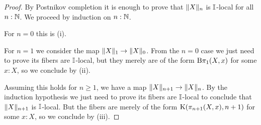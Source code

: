 \begin{proof}
By Postnikov completion it is enough to prove that $\lVert X \rVert_n$ is $\mathbb{I}$-local for all $n:\mathbb{N}$. We proceed by induction on $n:\mathbb{N}$. 

For $n=0$ this is (i).

For $n=1$ we consider the map $\lVert X \rVert_1\to \lVert X \rVert_0$. From the $n=0$ case we just need to prove its fibers are $\mathbb{I}$-local, but they merely are of the form $\mathrm{B}\pi_1(X,x)$ for some $x:X$, so we conclude by (ii). 

Assuming this holds for $n\geq 1$, we have a map $\lVert X \rVert_{n+1}\to \lVert X \rVert_n$. By the induction hypothesis we just need to prove its fibers are $\mathbb{I}$-local to conclude that $\lVert X \rVert_{n+1}$ is $\mathbb{I}$-local. But the fibers are merely of the form ${\mathrm{K}}(\pi_{n+1}(X,x),n+1)$ for some $x:X$, so we conclude by (iii). 
\end{proof}


